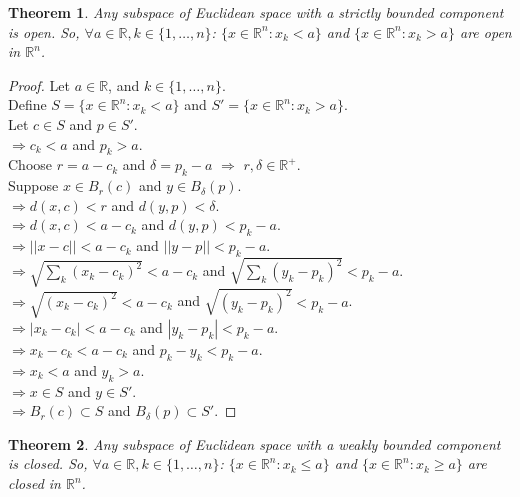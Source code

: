 \documentclass{article}
\newtheorem{theorem}{Theorem}[section]
\begin{document}
			\begin{theorem}
				Any subspace of Euclidean space with a strictly bounded component is open. So, $\forall a \in \mathbb{R}, k \in \{ 1, \ldots, n \}$: 
				$\{ x \in \mathbb{R}^n: x_k < a \}$ and $\{ x \in \mathbb{R}^n: x_k > a \}$ are open in $\mathbb{R}^n$.
			\end{theorem}
			\begin{proof} 
				Let $a \in \mathbb{R}$, and $k \in \{ 1, \ldots, n \}$.\\
				Define $S = \{ x \in \mathbb{R}^n: x_k < a \}$ and $S' = \{ x \in \mathbb{R}^n: x_k > a \}$.\\
				Let $c \in S$ and $p \in S'$.\\
				$\Rightarrow c_k < a$ and $p_k > a$.\\
				Choose $r = a - c_k$ and $\delta = p_k - a$ $\Rightarrow$ $r, \delta \in \mathbb{R}^+$.\\
				Suppose $x \in B_{r}(c)$ and $y \in B_{\delta}(p)$.\\
				$\Rightarrow d(x, c) < r$ and $d(y, p) < \delta$.\\
				$\Rightarrow d(x, c) < a - c_k$ and $d(y, p) < p_k - a$.\\
				$\Rightarrow || x - c || < a - c_k$ and $|| y - p || < p_k - a$.\\
				$\Rightarrow \sqrt{\sum_{k} (x_k - c_k)^2} <  a - c_k$ and $\sqrt{\sum_{k} (y_k - p_k)^2} < p_k - a$.\\
				$\Rightarrow \sqrt{(x_k - c_k)^2} <  a - c_k$ and $\sqrt{(y_k - p_k)^2} < p_k - a$.\\
				$\Rightarrow | x_k - c_k | <  a - c_k$ and $| y_k - p_k | <  p_k - a$.\\
				$\Rightarrow x_k - c_k <  a - c_k$ and $p_k - y_k < p_k - a$.\\
				$\Rightarrow x_k <  a$ and $y_k >  a$.\\
				$\Rightarrow x \in S$ and $y \in S'$.\\
				$\Rightarrow B_{r}(c) \subset S$ and $B_{\delta}(p) \subset S'$.
			\end{proof}

			\begin{theorem}
				Any subspace of Euclidean space with a weakly bounded component is closed. So, $\forall a \in \mathbb{R}, k \in \{ 1, \ldots, n \}$: 
				$\{ x \in \mathbb{R}^n: x_k \leq a \}$ and $\{ x \in \mathbb{R}^n: x_k \geq a \}$ are closed in $\mathbb{R}^n$.
			\end{theorem}
\end{document}
